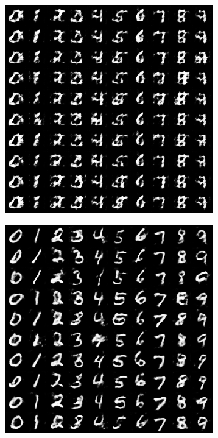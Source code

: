 \begin{figure}[H]
    \centering

    \begin{subfigure}{0.2\textwidth}
        \centering
        \includegraphics[width=0.95\linewidth]{cDCGAN/fake_sample_epoch_0001.png}
        \caption{}
        \label{subfig:cDCGAN/fake_sample_epoch_0001}
    \end{subfigure}%
    \begin{subfigure}{0.2\textwidth}
        \centering
        \includegraphics[width=0.95\linewidth]{cDCGAN/fake_sample_epoch_0002.png}

\end{subfigure}
\end{figure}
